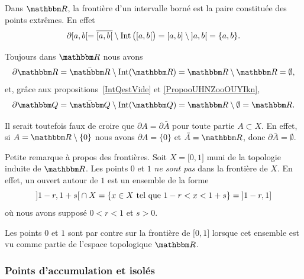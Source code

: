 \begin{example}
	Dans $\eR$, la frontière d'un intervalle borné est la paire constituée des points extrêmes. En effet
	\begin{equation}
		\partial\mathopen[ a , b [=\overline{ \mathopen[ a , b [ }\setminus\operatorname{Int}\big( \mathopen[ a , b [ \big)=\mathopen[ a , b \mathclose]\setminus\mathopen] a , b \mathclose[=\{ a,b \}.
	\end{equation}

	Toujours dans $\eR$ nous avons
	\begin{equation}
		\partial\eR=\bar\eR\setminus\Int(\eR)=\eR\setminus\eR=\emptyset,
	\end{equation}
	et, grâce aux propositions~\ref{IntQestVide} et \ref{PropooUHNZooOUYIkn},
	\begin{equation}
		\partial\eQ=\bar\eQ\setminus\Int(\eQ)=\eR\setminus\emptyset=\eR.
	\end{equation}
\end{example}

\begin{remark}
    Il serait toutefois faux de croire que \( \partial A=\partial \bar A\) pour toute partie \( A \subset X\). En effet, si \( A=\eR\setminus\{ 0 \}\) nous avons \( \partial A=\{ 0 \}\) et \( \bar A=\eR\), donc \( \partial \bar A=\emptyset\).
\end{remark}


\begin{remark}
    Petite remarque à propos des frontières. Soit \( X=\mathopen[ 0 , 1 \mathclose]\) muni de la topologie induite de \( \eR \). Les points \( 0\) et \( 1\) \emph{ne sont pas} dans la frontière de $X$. En effet, un ouvert autour de \( 1\) est un ensemble de la forme
    \begin{equation}
        \mathopen]1-r, 1+s \mathclose[ \cap X =\{ x\in X\text{ tel que } 1 - r < x < 1 + s \}=\mathopen] 1-r , 1 \mathclose]
    \end{equation}
    où nous avons supposé \( 0<r<1\) et \( s > 0 \).

    Les points \( 0\) et \( 1\) sont par contre sur la frontière de \( \mathopen[ 0 , 1 \mathclose]\) lorsque cet ensemble est vu comme partie de l'espace topologique \( \eR\).
\end{remark}

\subsubsection{Points d'accumulation et isolés}

